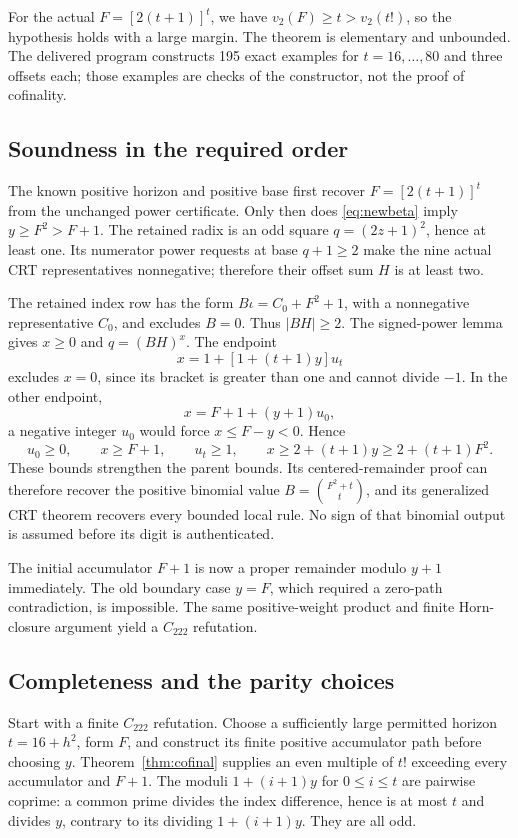 \documentclass[10pt,letterpaper]{article}
\theoremstyle{definition}\newtheorem{remark}[theorem]{Remark}
\begin{document}
For the actual $F=[2(t+1)]^t$, we have $v_2(F)\ge t>v_2(t!)$, so the
hypothesis holds with a large margin. The theorem is elementary and
unbounded. The delivered program constructs 195 exact examples for
$t=16,\ldots,80$ and three offsets each; those examples are checks of the
constructor, not the proof of cofinality.

\subsection{Soundness in the required order}

The known positive horizon and positive base first recover
$F=[2(t+1)]^t$ from the unchanged power certificate. Only then does
\eqref{eq:newbeta} imply $y\ge F^2>F+1$. The retained radix is an odd
square $q=(2z+1)^2$, hence at least one. Its numerator power requests at
base $q+1\ge2$ make the nine actual CRT representatives nonnegative;
therefore their offset sum $H$ is at least two.

The retained index row has the form
$B\iota=C_0+F^2+1$, with a nonnegative representative $C_0$, and excludes
$B=0$. Thus $|BH|\ge2$. The signed-power lemma gives
$x\ge0$ and $q=(BH)^x$. The endpoint
\[
 x=1+[1+(t+1)y]u_t
\]
excludes $x=0$, since its bracket is greater than one and cannot divide
$-1$. In the other endpoint,
\[
 x=F+1+(y+1)u_0,
\]
a negative integer $u_0$ would force $x\le F-y<0$. Hence
\[
 u_0\ge0,\qquad x\ge F+1,\qquad
 u_t\ge1,\qquad x\ge2+(t+1)y\ge2+(t+1)F^2.
\]
These bounds strengthen the parent bounds. Its centered-remainder proof
can therefore recover the positive binomial value
$B=\binom{F^2+t}{t}$, and its generalized CRT theorem recovers every
bounded local rule. No sign of that binomial output is assumed before
its digit is authenticated.

The initial accumulator $F+1$ is now a proper remainder modulo $y+1$
immediately. The old boundary case $y=F$, which required a zero-path
contradiction, is impossible. The same positive-weight product and finite
Horn-closure argument yield a $C_{222}$ refutation.

\subsection{Completeness and the parity choices}

Start with a finite $C_{222}$ refutation. Choose a sufficiently large
permitted horizon $t=16+h^2$, form $F$, and construct its finite positive
accumulator path before choosing $y$. Theorem~\ref{thm:cofinal} supplies
an even multiple of $t!$ exceeding every accumulator and $F+1$.
The moduli $1+(i+1)y$ for $0\le i\le t$ are pairwise coprime: a common
prime divides the index difference, hence is at most $t$ and divides $y$,
contrary to its dividing $1+(i+1)y$. They are all odd.
\end{document}
